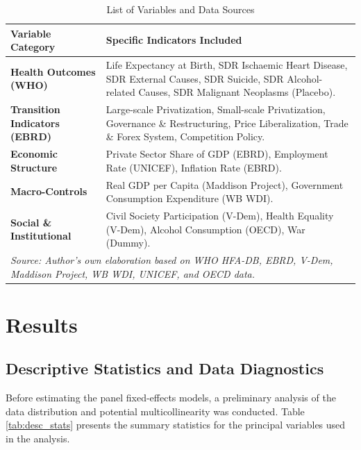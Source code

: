 \documentclass[12pt]{article}
\begin{document}
\begin{table}[ht]
\centering
\caption{List of Variables and Data Sources}
\label{tab:var_list}
\footnotesize
\begin{tabular}{p{4.5cm} p{8.5cm}}
\toprule
\textbf{Variable Category} & \textbf{Specific Indicators Included} \\
\midrule
\textbf{Health Outcomes (WHO)} & Life Expectancy at Birth, SDR Ischaemic Heart Disease, SDR External Causes, SDR Suicide, SDR Alcohol-related Causes, SDR Malignant Neoplasms (Placebo). \\
\midrule
\textbf{Transition Indicators (EBRD)} & Large-scale Privatization, Small-scale Privatization, Governance \& Restructuring, Price Liberalization, Trade \& Forex System, Competition Policy. \\
\midrule
\textbf{Economic Structure} & Private Sector Share of GDP (EBRD), Employment Rate (UNICEF), Inflation Rate (EBRD). \\
\midrule
\textbf{Macro-Controls} & Real GDP per Capita (Maddison Project), Government Consumption Expenditure (WB WDI). \\
\midrule
\textbf{Social \& Institutional} & Civil Society Participation (V-Dem), Health Equality (V-Dem), Alcohol Consumption (OECD), War (Dummy). \\
\bottomrule
\multicolumn{2}{p{13cm}}{\vspace{2pt}\scriptsize \textit{Source: Author's own elaboration based on WHO HFA-DB, EBRD, V-Dem, Maddison Project, WB WDI, UNICEF, and OECD data.}} \\
\end{tabular}
\end{table}

\section{Results}

\subsection{Descriptive Statistics and Data Diagnostics}

Before estimating the panel fixed-effects models, a preliminary analysis of the data distribution and potential multicollinearity was conducted. 
Table \ref{tab:desc_stats} presents the summary statistics for the principal variables used in the analysis. 
\end{document}
